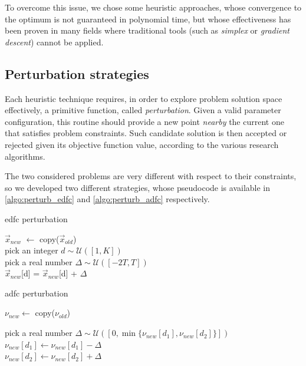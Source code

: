 \documentclass[12pt,journal,draftclsnofoot,onecolumn]{IEEEtran}
\begin{document}
To overcome this issue, we chose some heuristic approaches, whose convergence to the optimum is not guaranteed in polynomial time, but whose effectiveness has been proven in many fields \cite{Edelkamp2010} where traditional tools (such as \emph{simplex} or \emph{gradient descent}) cannot be applied.

\subsection{Perturbation strategies}
Each heuristic technique requires, in order to explore problem solution space effectively, a primitive function, called \emph{perturbation}.
Given a valid parameter configuration, this routine should provide a new point \emph{nearby} the current one that satisfies problem constraints.
Such candidate solution is then accepted or rejected given its objective function value, according to the various research algorithms.

\smallbreak
The two considered problems are very different with respect to their constraints, so we developed two different strategies, whose pseudocode is available in \autoref{algo:perturb_edfc} and \autoref{algo:perturb_adfc} respectively.

\begin{algorithm}[htp]
\caption{\gls{edfc} perturbation} \label{algo:perturb_edfc}

	 {
		$\vec{x}_{new}$ $\gets$ copy($\vec{x}_{old}$) \\
		pick an integer $d \sim \mathcal{U}([1, K])$ \\
		pick a real number $\Delta \sim \mathcal{U}([-2T, T])$ \\
		$\vec{x}_{new}$[d] = $\vec{x}_{new}$[d] + $\Delta$
	}
\end{algorithm}

\begin{algorithm}[htp]
\caption{\gls{adfc} perturbation} \label{algo:perturb_adfc}
	 {
		$\nu_{new} \gets$ copy($\nu_{old}$) \\


		pick a real number $\Delta \sim \mathcal{U}([0, \min\{\nu_{new}[d_1], \nu_{new}[d_2]\}])$ \\

		$\nu_{new}[d_1] \gets \nu_{new}[d_1] - \Delta$ \\
		$\nu_{new}[d_2] \gets \nu_{new}[d_2] + \Delta$ \\
	}
\end{algorithm}
\end{document}
